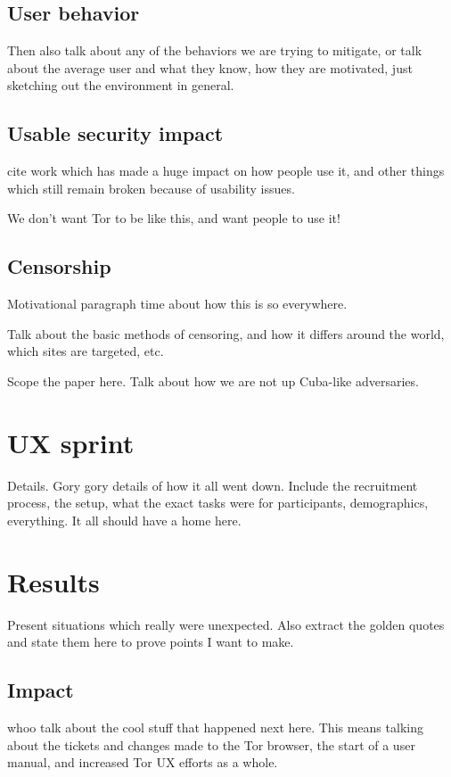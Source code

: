 \documentclass{sig-alternate-hotpets15}
\begin{document}
\subsection{User behavior}
Then also talk about any of the behaviors we are trying to mitigate,
or talk about the average user and what they know, how they are motivated,
just sketching out the environment in general. 

\subsection{Usable security impact} 
cite work which has made a huge impact on how people use it, and 
other things which still remain broken because of usability issues. 

We don't want Tor to be like this, and want people to use it!

\subsection{Censorship} 
Motivational paragraph time about how this is so everywhere. 

Talk about the basic methods of censoring, and how it differs 
around the world, which sites are targeted, etc. 

Scope the paper here. Talk about how we are not up Cuba-like adversaries. 

\section{UX sprint} 
Details. Gory gory details of how it all went down. 
Include the recruitment process, the setup, what the exact 
tasks were for participants, demographics, everything. 
It all should have a home here. 

\section{Results}
Present situations which really were unexpected. 
Also extract the golden quotes and state them here 
to prove points I want to make.  

\subsection{Impact}
whoo talk about the cool stuff that happened next here. 
This means talking about the tickets and changes made 
to the Tor browser, the start of a user manual, and 
increased Tor UX efforts as a whole.
\end{document}
